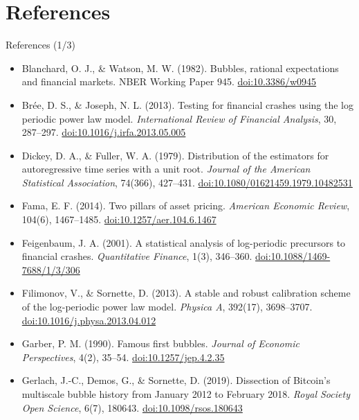 \section{References}

\begin{frame}{References (1/3)}
\itemsize{\scriptsize}
\begin{itemize}
    \item Blanchard, O. J., \& Watson, M. W. (1982). Bubbles, rational expectations and financial markets. NBER Working Paper 945. \href{https://doi.org/10.3386/w0945}{doi:10.3386/w0945}
    \item Brée, D. S., \& Joseph, N. L. (2013). Testing for financial crashes using the log periodic power law model. \textit{International Review of Financial Analysis}, 30, 287--297. \href{https://doi.org/10.1016/j.irfa.2013.05.005}{doi:10.1016/j.irfa.2013.05.005}
    \item Dickey, D. A., \& Fuller, W. A. (1979). Distribution of the estimators for autoregressive time series with a unit root. \textit{Journal of the American Statistical Association}, 74(366), 427--431. \href{https://doi.org/10.1080/01621459.1979.10482531}{doi:10.1080/01621459.1979.10482531}
    \item Fama, E. F. (2014). Two pillars of asset pricing. \textit{American Economic Review}, 104(6), 1467--1485. \href{https://doi.org/10.1257/aer.104.6.1467}{doi:10.1257/aer.104.6.1467}
    \item Feigenbaum, J. A. (2001). A statistical analysis of log-periodic precursors to financial crashes. \textit{Quantitative Finance}, 1(3), 346--360. \href{https://doi.org/10.1088/1469-7688/1/3/306}{doi:10.1088/1469-7688/1/3/306}
    \item Filimonov, V., \& Sornette, D. (2013). A stable and robust calibration scheme of the log-periodic power law model. \textit{Physica A}, 392(17), 3698--3707. \href{https://doi.org/10.1016/j.physa.2013.04.012}{doi:10.1016/j.physa.2013.04.012}
    \item Garber, P. M. (1990). Famous first bubbles. \textit{Journal of Economic Perspectives}, 4(2), 35--54. \href{https://doi.org/10.1257/jep.4.2.35}{doi:10.1257/jep.4.2.35}
    \item Gerlach, J.-C., Demos, G., \& Sornette, D. (2019). Dissection of Bitcoin\textquoteright s multiscale bubble history from January 2012 to February 2018. \textit{Royal Society Open Science}, 6(7), 180643. \href{https://doi.org/10.1098/rsos.180643}{doi:10.1098/rsos.180643}
\end{itemize}
\end{frame}

